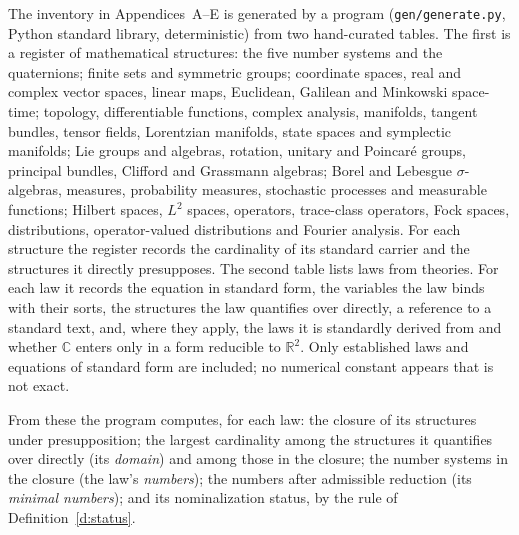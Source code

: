 \documentclass{situationist-preprint}
\begin{document}
The inventory in Appendices~A--E is generated by a program (\texttt{gen/generate.py}, Python standard library, deterministic) from two hand-curated tables. The first is a register of \nStructures{} mathematical structures: the five number systems and the quaternions; finite sets and symmetric groups; coordinate spaces, real and complex vector spaces, linear maps, Euclidean, Galilean and Minkowski space-time; topology, differentiable functions, complex analysis, manifolds, tangent bundles, tensor fields, Lorentzian manifolds, state spaces and symplectic manifolds; Lie groups and algebras, rotation, unitary and Poincar\'e groups, principal bundles, Clifford and Grassmann algebras; Borel and Lebesgue $\sigma$-algebras, measures, probability measures, stochastic processes and measurable functions; Hilbert spaces, $L^2$ spaces, operators, trace-class operators, Fock spaces, distributions, operator-valued distributions and Fourier analysis. For each structure the register records the cardinality of its standard carrier and the structures it directly presupposes. The second table lists \nLaws{} laws from \nTheories{} theories. For each law it records the equation in standard form, the variables the law binds with their sorts, the structures the law quantifies over directly, a reference to a standard text, and, where they apply, the laws it is standardly derived from and whether $\mathbb C$ enters only in a form reducible to $\mathbb R^2$. Only established laws and equations of standard form are included; no numerical constant appears that is not exact.

From these the program computes, for each law: the closure of its structures under presupposition; the largest cardinality among the structures it quantifies over directly (its \emph{domain}) and among those in the closure; the number systems in the closure (the law's \emph{numbers}); the numbers after admissible reduction (its \emph{minimal numbers}); and its nominalization status, by the rule of Definition~\ref{d:status}.
\end{document}
